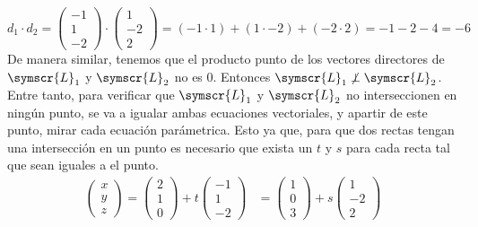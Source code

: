 \documentclass{article}
\def\fancyL{\symscr{L}}
\begin{document}
\begin{enumerate}
        \[
            d_1 \cdot d_2 = 
            \begin{pmatrix}
                -1 \\ 1 \\ -2 
            \end{pmatrix}
            \cdot
            \begin{pmatrix}
                1 \\ -2 \\ 2
            \end{pmatrix}
            =
            (-1 \cdot 1) + (1 \cdot -2) + (-2 \cdot 2)
            = 
            -1 -2 -4
            = 
            -6
        \]
        De manera similar, tenemos que el producto punto de los vectores directores de \(\fancyL_1\) y \(\fancyL_2\) no es 0. Entonces \(\fancyL_1 \not\perp \fancyL_2\).
        Entre tanto, para verificar que \(\fancyL_1\) y \(\fancyL_2\) no interseccionen en ningún punto, se va a igualar ambas ecuaciones vectoriales,
        y apartir de este punto, mirar cada ecuación parámetrica. Esto ya que, 
        para que dos rectas tengan una intersección en un punto es necesario que exista un \(t\) y \(s\) para cada recta tal que sean iguales a el punto.
        \[
            \begin{aligned}
                \begin{pmatrix}
                    x \\ y \\ z
                \end{pmatrix}
                =
                \begin{pmatrix}
                    2 \\ 1 \\ 0
                \end{pmatrix}
                +
                t
                \begin{pmatrix}
                    -1 \\ 1 \\ -2
                \end{pmatrix}
                &=
                \begin{pmatrix}
                    1 \\ 0 \\ 3
                \end{pmatrix}
                +
                s
                \begin{pmatrix}
                    1 \\ -2 \\ 2

\end{pmatrix}
\end{aligned}\]
\end{enumerate}
\end{document}

